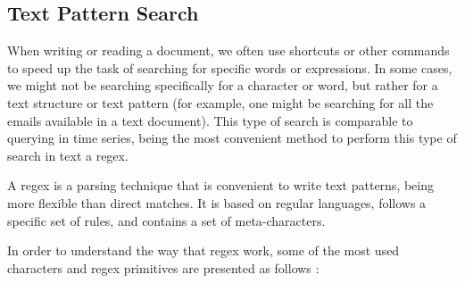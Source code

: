\subsection{Text Pattern Search}
\label{subsec:regex_theory}

When writing or reading a document, we often use shortcuts or other commands to speed up the task of searching for specific words or expressions. In some cases, we might not be searching specifically for a character or word, but rather for a text structure or text pattern (for example, one might be searching for all the emails available in a text document). This type of search is comparable to querying in time series, being the most convenient method to perform this type of search in text a \gls{regex}.
\par
A \gls{regex} is a parsing technique that is convenient to write text patterns, being more flexible than direct matches. It is based on regular languages, follows a specific set of rules, and contains a set of meta-characters.
\par
In order to understand the way that \gls{regex} work, some of the most used characters and \gls{regex} primitives are presented as follows \cite{regex2}:


